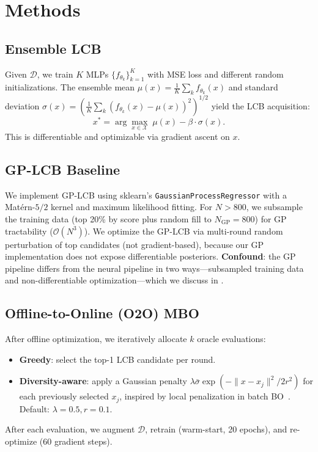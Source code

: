 \documentclass{article}
\theoremstyle{plain}
\theoremstyle{remark}
\newcommand{\cD}{\mathcal{D}}
\newcommand{\cX}{\mathcal{X}}
\begin{document}
\section{Methods}
\label{sec:method}

\subsection{Ensemble LCB}
Given $\cD$, we train $K$ MLPs $\{f_{\theta_k}\}_{k=1}^K$ with MSE loss and different random initializations.
The ensemble mean $\mu(x) = \frac{1}{K}\sum_k f_{\theta_k}(x)$ and standard deviation $\sigma(x) = (\frac{1}{K}\sum_k (f_{\theta_k}(x) - \mu(x))^2)^{1/2}$ yield the LCB acquisition:
\begin{equation}
    x^* = \arg\max_{x \in \cX}\; \mu(x) - \beta \cdot \sigma(x).
    \label{eq:lcb}
\end{equation}
This is differentiable and optimizable via gradient ascent on $x$.

\subsection{GP-LCB Baseline}
We implement GP-LCB using sklearn's \texttt{GaussianProcessRegressor} with a Mat\'{e}rn-$5/2$ kernel and maximum likelihood fitting.
For $N > 800$, we subsample the training data (top 20\% by score plus random fill to $N_{\mathrm{GP}}{=}800$) for GP tractability ($\mathcal{O}(N^3)$).
We optimize the GP-LCB via multi-round random perturbation of top candidates (not gradient-based), because our GP implementation does not expose differentiable posteriors.
\textbf{Confound}: the GP pipeline differs from the neural pipeline in two ways---subsampled training data and non-differentiable optimization---which we discuss in .

\subsection{Offline-to-Online (O2O) MBO}
After offline optimization, we iteratively allocate $k$ oracle evaluations:
\begin{itemize}
    \item \textbf{Greedy}: select the top-1 LCB candidate per round.
    \item \textbf{Diversity-aware}: apply a Gaussian penalty $\lambda \bar{\sigma} \exp(-\|x - x_j\|^2 / 2r^2)$ for each previously selected $x_j$, inspired by local penalization in batch BO~\cite{gonzalez2016batch}.
    Default: $\lambda{=}0.5, r{=}0.1$.
\end{itemize}
After each evaluation, we augment $\cD$, retrain (warm-start, 20 epochs), and re-optimize (60 gradient steps).
\end{document}
